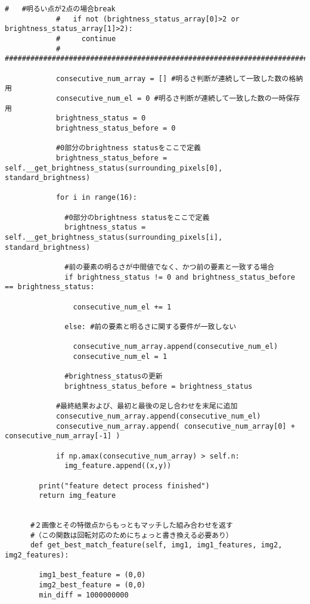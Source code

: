 \begin{lstlisting}[caption=FAST]
            #   #明るい点が2点の場合break
            #   if not (brightness_status_array[0]>2 or brightness_status_array[1]>2):
            #     continue
            # ######################################################################################
    
            consecutive_num_array = [] #明るさ判断が連続して一致した数の格納用
            consecutive_num_el = 0 #明るさ判断が連続して一致した数の一時保存用
            brightness_status = 0
            brightness_status_before = 0
    
            #0部分のbrightness statusをここで定義
            brightness_status_before = self.__get_brightness_status(surrounding_pixels[0], standard_brightness)
    
            for i in range(16):
    
              #0部分のbrightness statusをここで定義
              brightness_status = self.__get_brightness_status(surrounding_pixels[i], standard_brightness)
    
              #前の要素の明るさが中間値でなく、かつ前の要素と一致する場合
              if brightness_status != 0 and brightness_status_before == brightness_status:
    
                consecutive_num_el += 1
    
              else: #前の要素と明るさに関する要件が一致しない
    
                consecutive_num_array.append(consecutive_num_el)
                consecutive_num_el = 1
              
              #brightness_statusの更新
              brightness_status_before = brightness_status
            
            #最終結果および、最初と最後の足し合わせを末尾に追加
            consecutive_num_array.append(consecutive_num_el)
            consecutive_num_array.append( consecutive_num_array[0] + consecutive_num_array[-1] )
    
            if np.amax(consecutive_num_array) > self.n:
              img_feature.append((x,y))
    
        print("feature detect process finished")
        return img_feature
    
    
      #２画像とその特徴点からもっともマッチした組み合わせを返す
      #（この関数は回転対応のためにちょっと書き換える必要あり）
      def get_best_match_feature(self, img1, img1_features, img2, img2_features):
    
        img1_best_feature = (0,0)
        img2_best_feature = (0,0)
        min_diff = 1000000000
    

\end{lstlisting}
